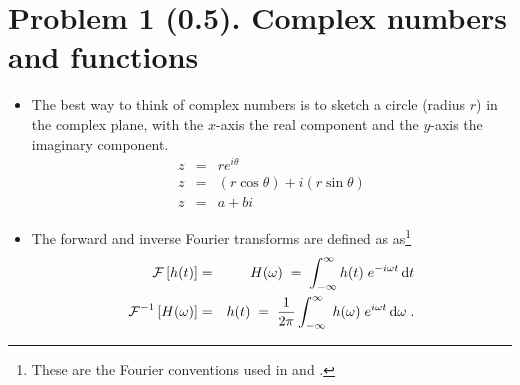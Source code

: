 \documentclass[11pt,titlepage,fleqn]{article}
\newcommand{\fft}{h}
\newcommand{\ffw}{H}
\begin{document}

\pagebreak
\section*{Problem 1 (0.5). Complex numbers and functions}

\begin{itemize}
\item The best way to think of complex numbers is to sketch a circle (radius $r$) in the complex plane, with the $x$-axis the real component and the $y$-axis the imaginary component.
%
\begin{eqnarray*}
z &=& r e^{i\theta}
\\
z &=& (r\cos\theta) + i(r\sin\theta)
\\
z &=& a + bi
\end{eqnarray*}



\item The forward and inverse Fourier transforms are defined as as\footnote{These are the Fourier conventions used in \citet[][p.~109]{DT} and \citet[][Section 6.4.2]{SteinWysession}.}
%
\begin{eqnarray}
\cF \left[ \fft(t) \right] &=& \ffw(\omega)
\;=\; \int_{-\infty}^{\infty} \fft(t) \; e^{-i\omega t} \,\rmd t
\label{fft}
\\
\cF^{-1} \left[ \ffw(\omega) \right] &=& \fft(t) 
\;=\; \frac{1}{2\pi} \int_{-\infty}^{\infty} \; \fft(\omega) \; e^{i\omega t} \,\rmd\omega 
\label{ifft}
\;.
\end{eqnarray}

\end{itemize}
\end{document}
